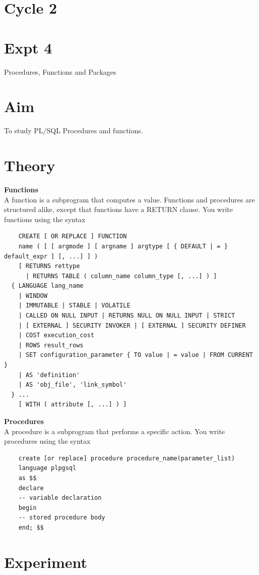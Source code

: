 \documentclass[13pt,oneside]{book}
\begin{document}
									\section*{Cycle 2}
									\section*{Expt 4}
									\begin{center}
										\Large{Procedures, Functions and Packages}
									\end{center}
									
									\section*{Aim}
									\large To study PL/SQL Procedures and functions.
									\section*{Theory}
									\textbf{Functions}\\
A function is a subprogram that computes a value. Functions and procedures
are structured alike, except that functions have a RETURN clause. You write
functions using the syntax\\
\begin{verbatim}
	CREATE [ OR REPLACE ] FUNCTION
    name ( [ [ argmode ] [ argname ] argtype [ { DEFAULT | = } default_expr ] [, ...] ] )
    [ RETURNS rettype
      | RETURNS TABLE ( column_name column_type [, ...] ) ]
  { LANGUAGE lang_name
    | WINDOW
    | IMMUTABLE | STABLE | VOLATILE
    | CALLED ON NULL INPUT | RETURNS NULL ON NULL INPUT | STRICT
    | [ EXTERNAL ] SECURITY INVOKER | [ EXTERNAL ] SECURITY DEFINER
    | COST execution_cost
    | ROWS result_rows
    | SET configuration_parameter { TO value | = value | FROM CURRENT }
    | AS 'definition'
    | AS 'obj_file', 'link_symbol'
  } ...
    [ WITH ( attribute [, ...] ) ]
\end{verbatim}
\textbf{Procedures}\\
A procedure is a subprogram that performs a specific action. You write procedures
using the syntax
\begin{verbatim}
	create [or replace] procedure procedure_name(parameter_list)
	language plpgsql
	as $$
	declare
	-- variable declaration
	begin
	-- stored procedure body
	end; $$
\end{verbatim}				\section*{Experiment}
\end{document}
